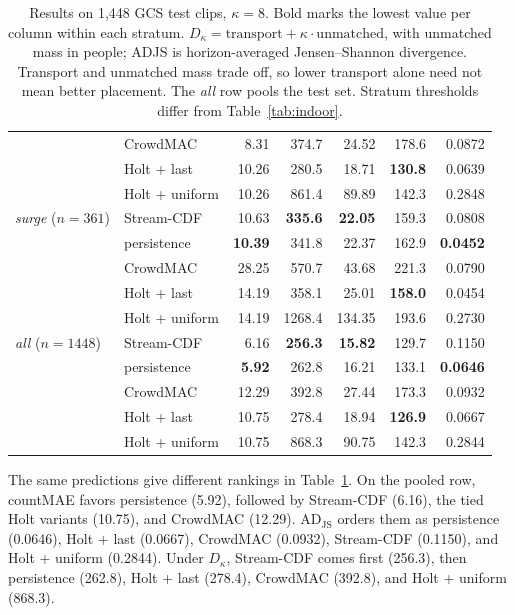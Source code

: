 \documentclass{article}
\begin{document}
\begin{table}[t]
\begin{tabular}{llrrrrr}
     & CrowdMAC & 8.31 & 374.7 & 24.52 & 178.6 & 0.0872 \\
     & Holt + last & 10.26 & 280.5 & 18.71 & \textbf{130.8} & 0.0639 \\
     & Holt + uniform & 10.26 & 861.4 & 89.89 & 142.3 & 0.2848 \\
    \midrule
    \emph{surge} ($n=361$) & Stream-CDF & 10.63 & \textbf{335.6} & \textbf{22.05} & 159.3 & 0.0808 \\
     & persistence & \textbf{10.39} & 341.8 & 22.37 & 162.9 & \textbf{0.0452} \\
     & CrowdMAC & 28.25 & 570.7 & 43.68 & 221.3 & 0.0790 \\
     & Holt + last & 14.19 & 358.1 & 25.01 & \textbf{158.0} & 0.0454 \\
     & Holt + uniform & 14.19 & 1268.4 & 134.35 & 193.6 & 0.2730 \\
    \midrule
    \emph{all} ($n=1448$) & Stream-CDF & 6.16 & \textbf{256.3} & \textbf{15.82} & 129.7 & 0.1150 \\
     & persistence & \textbf{5.92} & 262.8 & 16.21 & 133.1 & \textbf{0.0646} \\
     & CrowdMAC & 12.29 & 392.8 & 27.44 & 173.3 & 0.0932 \\
     & Holt + last & 10.75 & 278.4 & 18.94 & \textbf{126.9} & 0.0667 \\
     & Holt + uniform & 10.75 & 868.3 & 90.75 & 142.3 & 0.2844 \\
    \bottomrule
  \end{tabular}
  \caption{Results on 1{,}448 GCS test clips, $\kappa = 8$. Bold marks the lowest value per column within each stratum. $D_\kappa = \text{transport} + \kappa \cdot \text{unmatched}$, with unmatched mass in people; ADJS is horizon-averaged Jensen--Shannon divergence. Transport and unmatched mass trade off, so lower transport alone need not mean better placement. The \emph{all} row pools the test set. Stratum thresholds differ from Table~\ref{tab:indoor}.}
  \label{tab:gcs}
\end{table}

The same predictions give different rankings in Table~\ref{tab:gcs}. On the pooled row, countMAE favors persistence (5.92), followed by Stream-CDF (6.16), the tied Holt variants (10.75), and CrowdMAC (12.29). $\mathrm{AD_{JS}}$ orders them as persistence (0.0646), Holt + last (0.0667), CrowdMAC (0.0932), Stream-CDF (0.1150), and Holt + uniform (0.2844). Under $D_\kappa$, Stream-CDF comes first (256.3), then persistence (262.8), Holt + last (278.4), CrowdMAC (392.8), and Holt + uniform (868.3).
\end{document}
